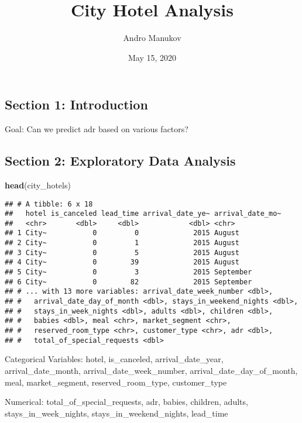 \documentclass[]{article}
\title{City Hotel Analysis}
\author{Andro Manukov}
\date{May 15, 2020}
\newenvironment{Shaded}{\begin{snugshade}}{\end{snugshade}}
\newcommand{\KeywordTok}[1]{\textcolor[rgb]{0.13,0.29,0.53}{\textbf{#1}}}
\newcommand{\NormalTok}[1]{#1}
\begin{document}
\maketitle

\hypertarget{section-1-introduction}{%
\subsection{Section 1: Introduction}\label{section-1-introduction}}

Goal: Can we predict adr based on various factors?

\hypertarget{section-2-exploratory-data-analysis}{%
\subsection{Section 2: Exploratory Data
Analysis}\label{section-2-exploratory-data-analysis}}

\begin{Shaded}
\begin{Highlighting}[]
\KeywordTok{head}\NormalTok{(city_hotels)}
\end{Highlighting}
\end{Shaded}

\begin{verbatim}
## # A tibble: 6 x 18
##   hotel is_canceled lead_time arrival_date_ye~ arrival_date_mo~
##   <chr>       <dbl>     <dbl>            <dbl> <chr>           
## 1 City~           0         0             2015 August          
## 2 City~           0         1             2015 August          
## 3 City~           0         5             2015 August          
## 4 City~           0        39             2015 August          
## 5 City~           0         3             2015 September       
## 6 City~           0        82             2015 September       
## # ... with 13 more variables: arrival_date_week_number <dbl>,
## #   arrival_date_day_of_month <dbl>, stays_in_weekend_nights <dbl>,
## #   stays_in_week_nights <dbl>, adults <dbl>, children <dbl>,
## #   babies <dbl>, meal <chr>, market_segment <chr>,
## #   reserved_room_type <chr>, customer_type <chr>, adr <dbl>,
## #   total_of_special_requests <dbl>
\end{verbatim}

Categorical Variables: hotel, is\_canceled, arrival\_date\_year,
arrival\_date\_month, arrival\_date\_week\_number,
arrival\_date\_day\_of\_month, meal, market\_segment,
reserved\_room\_type, customer\_type

Numerical: total\_of\_special\_requests, adr, babies, children, adults,
stays\_in\_week\_nights, stays\_in\_weekend\_nights, lead\_time
\end{document}

